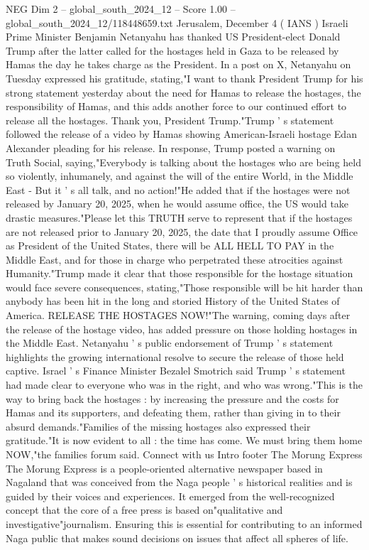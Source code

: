 \begin{textsample}{NEG Dim 2 – global\_south\_2024\_12 – Score 1.00 – global\_south\_2024\_12/118448659.txt}  \label{ex:f2_neg_382}
Jerusalem, December 4 ( IANS ) Israeli Prime Minister Benjamin Netanyahu has thanked US President-elect Donald Trump after the latter called for the hostages held in Gaza to be released by Hamas the day he takes charge as the President.
In a post on X, Netanyahu on Tuesday expressed his gratitude, stating,"I want to thank President Trump for his strong statement yesterday about the need for Hamas to release the hostages, the responsibility of Hamas, and this adds another force to our continued effort to release all the hostages.
Thank you, President Trump."Trump ' s statement followed the release of a video by Hamas showing American-Israeli hostage Edan Alexander pleading for his release.
In response, Trump posted a warning on Truth Social, saying,"Everybody is talking about the hostages who are being held so violently, inhumanely, and against the will of the entire World, in the Middle East - But it ' s all talk, and no action!"He added that if the hostages were not released by January 20, 2025, when he would assume office, the US would take drastic measures."Please let this TRUTH serve to represent that if the hostages are not released prior to January 20, 2025, the date that I proudly assume Office as President of the United States, there will be ALL HELL TO PAY in the Middle East, and for those in charge who perpetrated these atrocities against Humanity."Trump made it clear that those responsible for the hostage situation would face severe consequences, stating,"Those responsible will be hit harder than anybody has been hit in the long and storied History of the United States of America.
RELEASE THE HOSTAGES NOW!"The warning, coming days after the release of the hostage video, has added pressure on those holding hostages in the Middle East.
Netanyahu ' s public endorsement of Trump ' s statement highlights the growing international resolve to secure the release of those held captive.
Israel ' s Finance Minister Bezalel Smotrich said Trump ' s statement had made clear to everyone who was in the right, and who was wrong."This is the way to bring back the hostages : by increasing the pressure and the costs for Hamas and its supporters, and defeating them, rather than giving in to their absurd demands."Families of the missing hostages also expressed their gratitude."It is now evident to all : the time has come.
We must bring them home NOW,"the families forum said.
Connect with us Intro footer The Morung Express The Morung Express is a people-oriented alternative newspaper based in Nagaland that was conceived from the Naga people ' s historical realities and is guided by their voices and experiences.
It emerged from the well-recognized concept that the core of a free press is based on"qualitative and investigative"journalism.
Ensuring this is essential for contributing to an informed Naga public that makes sound decisions on issues that affect all spheres of life.

\end{textsample}

